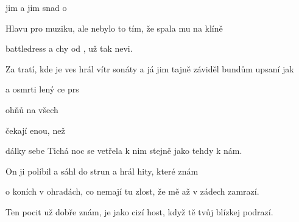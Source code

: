 
\zs
{} jim  a  jim  snad o    

Hlavu pro muziku, ale nebylo to tím, že spala mu na klíně

 battledress a chy od ,  už tak  nevi.

Za tratí, kde je ves hrál vítr sonáty a já jim tajně záviděl
\ks
\zr
{}bundům upsaní jak 

a osmrti lený ce prs 


 ohňů na všech 

čekají enou, než 

 dálky sebe
\kr
\zs
Tichá noc se vetřela k nim  stejně jako tehdy k nám.

On ji políbil a sáhl do strun a hrál hity, které znám

o koních v ohradách, co nemají tu zlost, že mě až v zádech zamrazí.

Ten pocit už dobře znám, je jako cizí host, když tě tvůj blízkej podrazí.
\ks
\zr
\kr
\kp





